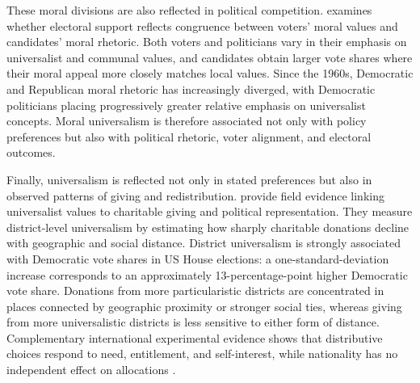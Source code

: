 \documentclass[11pt,a4paper]{article}
\begin{document}
These moral divisions are also reflected in political competition. \citet{enke_moral_2020} examines whether electoral support reflects congruence between voters' moral values and candidates' moral rhetoric. Both voters and politicians vary in their emphasis on universalist and communal values, and candidates obtain larger vote shares where their moral appeal more closely matches local values. Since the 1960s, Democratic and Republican moral rhetoric has increasingly diverged, with Democratic politicians placing progressively greater relative emphasis on universalist concepts. Moral universalism is therefore associated not only with policy preferences but also with political rhetoric, voter alignment, and electoral outcomes. %

Finally, universalism is reflected not only in stated preferences but also in observed patterns of giving and redistribution. \citet{enke_universalism_2024} provide field evidence linking universalist values to charitable giving and political representation. They measure district-level universalism by estimating how sharply charitable donations decline with geographic and social distance. District universalism is strongly associated with Democratic vote shares in US House elections: a one-standard-deviation increase %
corresponds to an approximately 13-percentage-point higher Democratic vote share. Donations from more particularistic districts are concentrated in places connected by geographic proximity or stronger social ties, whereas giving from more universalistic districts is less sensitive to either form of distance. %
Complementary international experimental evidence shows that distributive choices respond to need, entitlement, and self-interest, while nationality has no independent effect on allocations \citep{cappelen_needs_2013}. %
\end{document}
